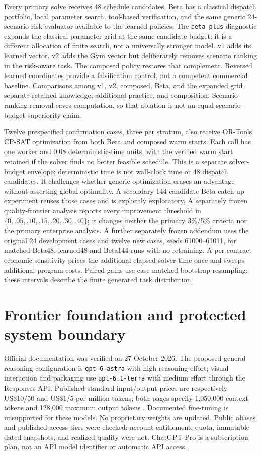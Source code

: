 Every primary solve receives 48 schedule candidates. Beta has a classical dispatch portfolio, local parameter search, tool-based verification, and the same generic 24-scenario risk evaluator available to the learned policies. The \texttt{beta\_plus} diagnostic expands the classical parameter grid at the same candidate budget; it is a different allocation of finite search, not a universally stronger model. v1 adds its learned vector. v2 adds the Gym vector but deliberately removes scenario ranking in the risk-aware task. The composed policy restores that complement. Reversed learned coordinates provide a falsification control, not a competent commercial baseline. Comparisons among v1, v2, composed, Beta, and the expanded grid separate retained knowledge, additional practice, and composition. Scenario-ranking removal saves computation, so that ablation is not an equal-scenario-budget superiority claim.

Twelve prespecified confirmation cases, three per stratum, also receive OR-Tools CP-SAT optimization from both Beta and composed warm starts. Each call has one worker and 0.08 deterministic-time units, with the verified warm start retained if the solver finds no better feasible schedule. This is a separate solver-budget envelope; deterministic time is not wall-clock time or 48 dispatch candidates. It challenges whether generic optimization erases an advantage without asserting global optimality. A secondary 144-candidate Beta catch-up experiment reuses those cases and is explicitly exploratory. A separately frozen quality-frontier analysis reports every improvement threshold in $\{0,.05,.10,.15,.20,.30,.40\}$; it changes neither the primary 3\%/5\% criteria nor the primary enterprise analysis. A further separately frozen addendum uses the original 24 development cases and twelve new cases, seeds 61000--61011, for matched Beta48, learned48 and Beta144 runs with no retraining. A per-contract economic sensitivity prices the additional elapsed solver time once and sweeps additional program costs. Paired gains use case-matched bootstrap resampling; these intervals describe the finite generated task distribution.

\section{Frontier foundation and protected system boundary}
\label{sec:methods-foundation}

Official documentation was verified on 27 October 2026. The proposed general reasoning configuration is \texttt{gpt-6-astra} with high reasoning effort; visual interaction and packaging use \texttt{gpt-6.1-terra} with medium effort through the Responses API. Published standard input/output prices are respectively US\$10/50 and US\$1/5 per million tokens; both pages specify 1,050,000 context tokens and 128,000 maximum output tokens \cite{openai2026astra,openai2026terra}. Documented fine-tuning is unsupported for these models. No proprietary weights are updated. Public aliases and published access tiers were checked; account entitlement, quota, immutable dated snapshots, and realized quality were not. ChatGPT Pro is a subscription plan, not an API model identifier or automatic API access \cite{openai2026plans}.

